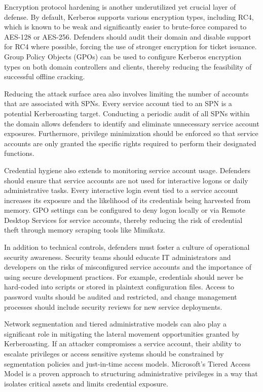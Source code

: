 Encryption protocol hardening is another underutilized yet crucial layer of defense. By default, Kerberos supports various encryption types, including RC4, which is known to be weak and significantly easier to brute-force compared to AES-128 or AES-256. Defenders should audit their domain and disable support for RC4 where possible, forcing the use of stronger encryption for ticket issuance. Group Policy Objects (GPOs) can be used to configure Kerberos encryption types on both domain controllers and clients, thereby reducing the feasibility of successful offline cracking.

Reducing the attack surface area also involves limiting the number of accounts that are associated with SPNs. Every service account tied to an SPN is a potential Kerberoasting target. Conducting a periodic audit of all SPNs within the domain allows defenders to identify and eliminate unnecessary service account exposures. Furthermore, privilege minimization should be enforced so that service accounts are only granted the specific rights required to perform their designated functions.

Credential hygiene also extends to monitoring service account usage. Defenders should ensure that service accounts are not used for interactive logons or daily administrative tasks. Every interactive login event tied to a service account increases its exposure and the likelihood of its credentials being harvested from memory. GPO settings can be configured to deny logon locally or via Remote Desktop Services for service accounts, thereby reducing the risk of credential theft through memory scraping tools like Mimikatz.

In addition to technical controls, defenders must foster a culture of operational security awareness. Security teams should educate IT administrators and developers on the risks of misconfigured service accounts and the importance of using secure development practices. For example, credentials should never be hard-coded into scripts or stored in plaintext configuration files. Access to password vaults should be audited and restricted, and change management processes should include security reviews for new service deployments.

Network segmentation and tiered administrative models can also play a significant role in mitigating the lateral movement opportunities granted by Kerberoasting. If an attacker compromises a service account, their ability to escalate privileges or access sensitive systems should be constrained by segmentation policies and just-in-time access models. Microsoft’s Tiered Access Model is a proven approach to structuring administrative privileges in a way that isolates critical assets and limits credential exposure.

